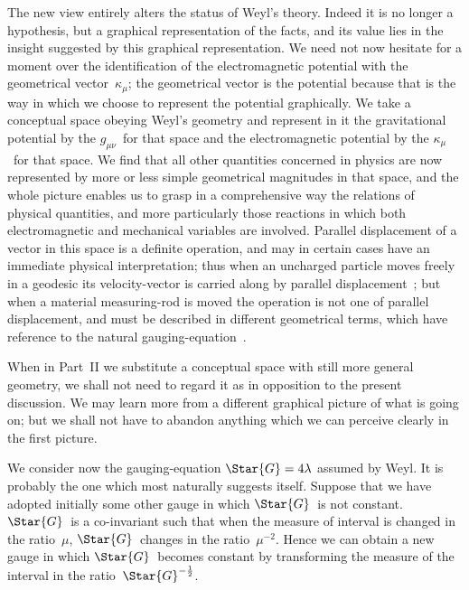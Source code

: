 \documentclass[12pt]{book}
\begin{document}
The new view entirely alters the status of Weyl's theory. Indeed it is no
%
longer a hypothesis, but a graphical representation of the facts, and its value
lies in the insight suggested by this graphical representation. We need not
now hesitate for a moment over the identification of the electromagnetic
potential with the geometrical vector~$\kappa_{\mu}$; the geometrical vector is the
potential because that is the way in which we choose to represent the
potential graphically. We take a conceptual space obeying Weyl's geometry
and represent in it the gravitational potential by the $g_{\mu\nu}$~for that space and
the electromagnetic potential by the $\kappa_{\mu}$~for that space. We find that all
other quantities concerned in physics are now represented by more or less
simple geometrical magnitudes in that space, and the whole picture enables
us to grasp in a comprehensive way the relations of physical quantities,
and more particularly those reactions in which both electromagnetic and
mechanical variables are involved. Parallel displacement of a vector in this
space is a definite operation, and may in certain cases have an immediate
physical interpretation; thus when an uncharged particle moves freely in a
geodesic its velocity\hyp{}vector is carried along by parallel displacement~;
but when a material measuring\hyp{}rod is moved the operation is not one of
parallel displacement, and must be described in different geometrical terms,
which have reference to the natural gauging\hyp{}equation~.

When in Part~II we substitute a conceptual space with still more general
geometry, we shall not need to regard it as in opposition to the present
discussion. We may learn more from a different graphical picture of what is
going on; but we shall not have to abandon anything which we can perceive
clearly in the first picture.

We consider now the gauging\hyp{}equation $\Star{G} = 4\lambda$ assumed by Weyl. It is
probably the one which most naturally suggests itself. Suppose that we
have adopted initially some other gauge in which $\Star{G}$~is not constant. $\Star{G}$~is
a co\hyp{}invariant such that when the measure of interval is changed in the ratio~$\mu$,
$\Star{G}$~changes in the ratio~$\mu^{-2}$. Hence we can obtain a new gauge in which
$\Star{G}$~becomes constant by transforming the measure of the interval in the
ratio~$\Star{G}^{-\frac{1}{2}}$.
\end{document}
